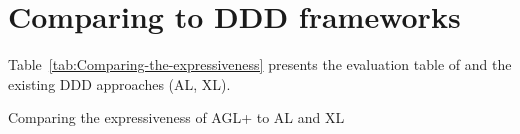 \section{Comparing to DDD frameworks} \label{apex:compareAGLwithOther}


Table~\ref{tab:Comparing-the-expressiveness} presents the evaluation table of \agldcsl and the existing DDD approaches (AL, XL). 

	\begin{table*}[ht]
	\centering
	\caption{Comparing the expressiveness of AGL+ to AL and XL} \label{tab:Comparing-the-expressiveness}
	\footnotesize
	\setlength\tabcolsep{1pt}
\end{table*}
